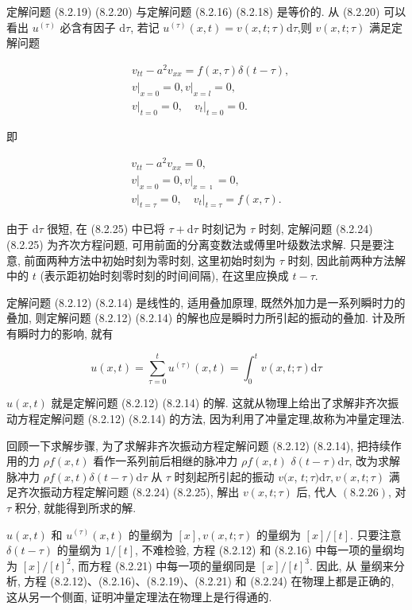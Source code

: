 定解问题 (8.2.19) (8.2.20) 与定解问题 (8.2.16) (8.2.18) 是等价的. 从 (8.2.20) 可以看出 $u^{(\tau)}$ 必含有因子 $\mathrm{d} \tau$, 若记 $u^{(\tau)}(x, t)=v(x, t ; \tau) \mathrm{d} \tau$,则 $v(x, t ; \tau)$ 满足定解问题

$$
\begin{aligned}
& v_{t t}-a^{2} v_{x x}=f(x, \tau) \delta(t-\tau), \\
&\left.v\right|_{x=0}=0,\left.v\right|_{x=l}=0, \\
&\left.v\right|_{t=0}=0,\left.\quad v_{t}\right|_{t=0}=0 .
\end{aligned}
$$

即

$$
\begin{gathered}
v_{t t}-a^{2} v_{x x}=0, \\
\left.v\right|_{x=0}=0,\left.v\right|_{x=\imath}=0, \\
\left.v\right|_{t=\tau}=0,\left.\quad v_{t}\right|_{t=\tau}=f(x, \tau) .
\end{gathered}
$$

由于 $\mathrm{d} \tau$ 很短, 在 (8.2.25) 中已将 $\tau+\mathrm{d} \tau$ 时刻记为 $\tau$ 时刻, 定解问题 (8.2.24) (8.2.25) 为齐次方程问题, 可用前面的分离变数法或傅里叶级数法求解. 只是要注意, 前面两种方法中初始时刻为零时刻, 这里初始时刻为 $\tau$ 时刻, 因此前两种方法解中的 $t$ (表示距初始时刻零时刻的时间间隔), 在这里应换成 $t-\tau$.

定解问题 (8.2.12) (8.2.14) 是线性的, 适用叠加原理, 既然外加力是一系列瞬时力的叠加, 则定解问题 (8.2.12) (8.2.14) 的解也应是瞬时力所引起的振动的叠加. 计及所有瞬时力的影响, 就有

$$
u(x, t)=\sum_{\tau=0}^{t} u^{(\tau)}(x, t)=\int_{0}^{t} v(x, t ; \tau) \mathrm{d} \tau
$$

$u(x, t)$ 就是定解问题 (8.2.12) (8.2.14) 的解. 这就从物理上给出了求解非齐次振动方程定解问题 (8.2.12) (8.2.14) 的方法, 因为利用了冲量定理,故称为冲量定理法.

回顾一下求解步骤, 为了求解非齐次振动方程定解问题 (8.2.12) (8.2.14), 把持续作用的力 $\rho f(x, t)$ 看作一系列前后相继的脉冲力 $\rho f(x, t)$ $\delta(t-\tau) \mathrm{d} \tau$, 改为求解脉冲力 $\rho f(x, t) \delta(t-\tau) \mathrm{d} \tau$ 从 $\tau$ 时刻起所引起的振动 $v(x$, $t ; \tau) \mathrm{d} \tau, v(x, t ; \tau)$ 满足齐次振动方程定解问题 (8.2.24) (8.2.25), 解出 $v(x, t ; \tau)$ 后, 代人 $(8.2 .26)$, 对 $\tau$ 积分, 就能得到所求的解.

$u(x, t)$ 和 $u^{(\tau)}(x, t)$ 的量纲为 $[x], v(x, t ; \tau)$ 的量纲为 $[x] /[t]$. 只要注意 $\delta(t-\tau)$ 的量纲为 $1 /[t]$, 不难检验, 方程 (8.2.12) 和 (8.2.16) 中每一项的量纲均为 $[x] /[t]^{2}$, 而方程 (8.2.21) 中每一项的量纲同是 $[x] /[t]^{3}$. 因此, 从
量纲来分析, 方程 (8.2.12)、(8.2.16)、(8.2.19)、(8.2.21) 和 (8.2.24) 在物理上都是正确的, 这从另一个侧面, 证明冲量定理法在物理上是行得通的.

